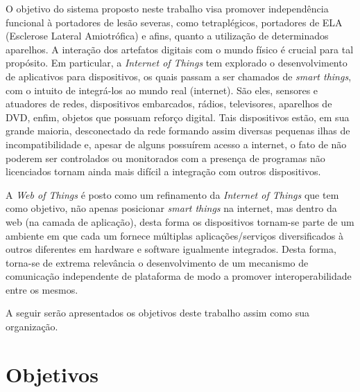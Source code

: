 \documentclass[12pt,a4paper,oneside]{report}
\begin{document}
O objetivo do sistema proposto neste trabalho visa promover independência funcional à portadores de lesão severas, como tetraplégicos, portadores de ELA (Esclerose Lateral Amiotrófica) e afins, quanto a utilização de determinados aparelhos. A interação dos artefatos digitais com o mundo físico é crucial para tal propósito. Em particular, a \emph{Internet of Things}\cite{IoT} tem explorado o desenvolvimento de aplicativos para dispositivos, os quais passam a ser chamados de \emph{smart things}, com o intuito de integrá-los ao mundo real (internet). São eles, sensores e atuadores de redes, dispositivos embarcados, rádios, televisores, aparelhos de DVD, enfim, objetos que possuam reforço digital. Tais dispositivos estão, em sua grande maioria, desconectado da rede formando assim diversas pequenas ilhas de incompatibilidade e, apesar de alguns possuírem acesso a internet, o fato de não poderem ser controlados ou monitorados com a presença de programas não licenciados tornam ainda mais difícil a integração com outros dispositivos.

A \emph{Web of Things} \cite{wotdovad} é posto como um refinamento da \emph{Internet of Things} que tem como objetivo, não apenas posicionar \emph{smart things} na internet, mas dentro da web (na camada de aplicação), desta forma os dispositivos tornam-se parte de um ambiente em que cada um fornece múltiplas aplicações/serviços diversificados à outros diferentes em hardware e software igualmente integrados. Desta forma, torna-se de extrema relevância o desenvolvimento de um mecanismo de comunicação independente de plataforma de modo a promover interoperabilidade entre os mesmos.

A seguir serão apresentados os objetivos deste trabalho assim como sua organização.

\section{Objetivos}
\end{document}
